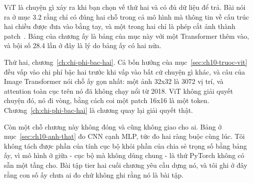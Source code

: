 ViT là chuyện gì xảy ra khi bạn chọn vế thứ hai và có đủ dữ liệu để trả. Bài
nói ra ở mục 3.2 rằng chỉ có đúng hai chỗ trong cả mô hình mà thông tin về cấu
trúc hai chiều được đưa vào bằng tay, và một trong hai chỉ là phép cắt ảnh
thành patch~\autocite{dosovitskiy2021vit}. Bảng của chương ấy là bảng của mục
này với một Transformer thêm vào, và bội số 28.4 lần ở đây là lý do bảng ấy có
hai nửa.

Thứ hai, chương~\ref{ch:chi-phi-bac-hai}. Cả bốn hướng của
mục~\ref{sec:ch10-truoc-vit} đều vấp vào chi phí bậc hai trước khi vấp vào bất
cứ chuyện gì khác, và câu của Image Transformer nói chỗ ấy gọn nhất: một ảnh
32x32 là 3072 vị trí, và attention toàn cục trên nó đã không chạy nổi từ 2018.
ViT không giải quyết chuyện đó, nó đi vòng, bằng cách coi một patch 16x16 là
một token. Chương~\ref{ch:chi-phi-bac-hai} là chương quay lại giải quyết thật.

Còn một chỗ chương này không đóng và cũng không giao cho ai. Bảng ở
mục~\ref{sec:ch10-anh-that} đo CNN cạnh MLP, tức đo hai ràng buộc cùng lúc. Tôi
không tách được phần của tính cục bộ khỏi phần của chia sẻ trọng số bằng bảng
ấy, vì mô hình ở giữa - cục bộ mà không dùng chung - là thứ PyTorch không có
sẵn một tầng cho. Bài tập tier hai cuối chương yêu cầu dựng nó, và tôi ghi ở
đây rằng con số ấy chưa ai đo chứ không ghi rằng nó là bài tập.
